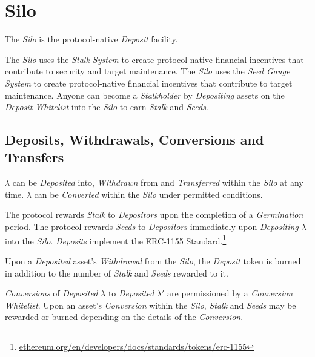 \documentclass[tikz]{article}
\newcommand{\term}[1]{\textsl{#1}}
\newcommand{\fref}[1]{\footnote{\href{http://#1}{#1}}}
\begin{document}
\vspace*{-1mm}
\section{Silo}
\vspace*{-1mm}

The \term{Silo} is the protocol-native \term{Deposit} facility.

The \term{Silo} uses the \term{Stalk System} to create protocol-native financial incentives that contribute to security and target maintenance. The \term{Silo} uses the \term{Seed Gauge System} to create protocol-native financial incentives that contribute to target maintenance. Anyone can become a \term{Stalkholder} by \term{Depositing} assets on the \term{Deposit Whitelist} into the \term{Silo} to earn \term{Stalk} and \term{Seeds}.


\vspace*{-1.2mm}
\subsection{Deposits, Withdrawals, Conversions and Transfers}
\vspace*{-1.2mm}

$\lambda$ can be \term{Deposited} into, \term{Withdrawn} from and \term{Transferred} within the \term{Silo} at any time. $\lambda$ can be \term{Converted} within the \term{Silo} under permitted conditions. 

The protocol rewards \term{Stalk} to \term{Depositors} upon the completion of a \term{Germination} period. The protocol rewards \term{Seeds} to \term{Depositors} immediately upon \term{Depositing} $\lambda$ into the \term{Silo}. \term{Deposits} implement the ERC-1155 Standard.\fref{ethereum.org/en/developers/docs/standards/tokens/erc-1155}

Upon a \term{Deposited} asset's \term{Withdrawal} from the \term{Silo}, the \term{Deposit} token is burned in addition to the number of \term{Stalk} and \term{Seeds} rewarded to it. 

\vspace*{1.2mm}

\term{Conversions} of \term{Deposited} $\lambda$ to \term{Deposited} $\lambda'$ are permissioned by a \term{Conversion Whitelist}. Upon an asset's \term{Conversion} within the \term{Silo}, \term{Stalk} and \term{Seeds} may be rewarded or burned depending on the details of the \term{Conversion}.
\end{document}
